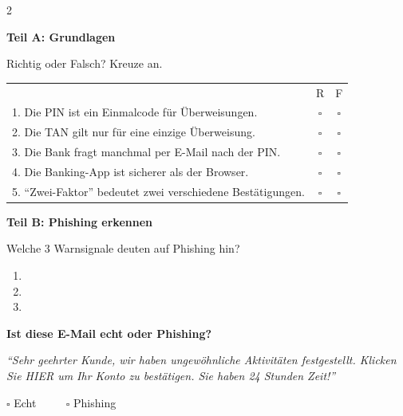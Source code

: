 \documentclass[a4paper,landscape,8pt]{extarticle}
\begin{document}
\begin{multicols}{2}

\textbf{\large Teil A: Grundlagen}

Richtig oder Falsch? Kreuze an.

\vspace{2mm}

\renewcommand{\arraystretch}{1.6}
\begin{tabular}{@{}p{8cm}cc@{}}
& R & F \\
1. Die PIN ist ein Einmalcode für Überweisungen. & $\square$ & $\square$ \\
2. Die TAN gilt nur für eine einzige Überweisung. & $\square$ & $\square$ \\
3. Die Bank fragt manchmal per E-Mail nach der PIN. & $\square$ & $\square$ \\
4. Die Banking-App ist sicherer als der Browser. & $\square$ & $\square$ \\
5. ``Zwei-Faktor'' bedeutet zwei verschiedene Bestätigungen. & $\square$ & $\square$ \\
\end{tabular}
\renewcommand{\arraystretch}{1}

\vspace{6mm}

\textbf{\large Teil B: Phishing erkennen}

Welche 3 Warnsignale deuten auf Phishing hin?

\vspace{2mm}

\begin{enumerate}
\item \dotfill
\item \dotfill
\item \dotfill
\end{enumerate}

\vspace{4mm}

\textbf{Ist diese E-Mail echt oder Phishing?}

\vspace{2mm}

{\footnotesize\itshape ``Sehr geehrter Kunde, wir haben ungewöhnliche Aktivitäten festgestellt. Klicken Sie HIER um Ihr Konto zu bestätigen. Sie haben 24 Stunden Zeit!''}

\vspace{2mm}

$\square$ Echt ~~~~ $\square$ Phishing

\vspace{2mm}


\end{multicols}
\end{document}
